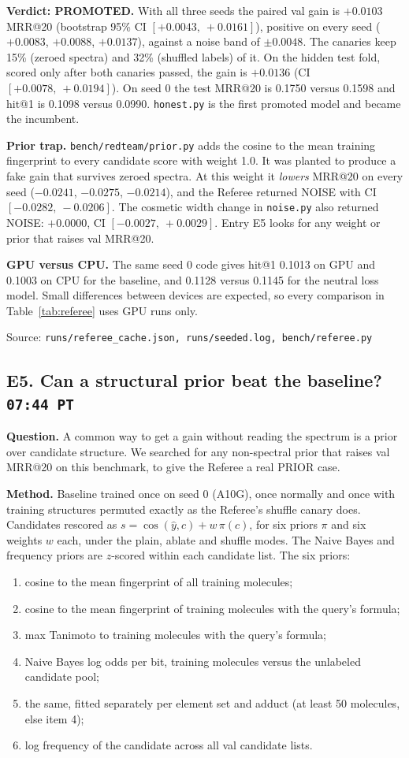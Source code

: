 \documentclass[11pt]{article}
\newcommand{\entry}[2]{\subsection*{#1\hfill{\normalfont\small\texttt{#2}}}}
\newcommand{\src}[1]{{\small\color{black!60}Source: \texttt{#1}}}
\begin{document}
\textbf{Verdict: PROMOTED.} With all three seeds the paired val gain is $+0.0103$ MRR@20 (bootstrap 95\% CI
$[+0.0043,\ +0.0161]$), positive on every seed ($+0.0083$, $+0.0088$, $+0.0137$), against a noise band of
$\pm 0.0048$. The canaries keep 15\% (zeroed spectra) and 32\% (shuffled labels) of it. On the hidden test fold,
scored only after both canaries passed, the gain is $+0.0136$ (CI $[+0.0078,\ +0.0194]$). On seed 0 the test MRR@20 is 0.1750 versus
0.1598 and hit@1 is 0.1098 versus 0.0990. \texttt{honest.py} is the first promoted model and became the incumbent.

\textbf{Prior trap.} \texttt{bench/redteam/prior.py} adds the cosine to the mean training fingerprint to every
candidate score with weight 1.0. It was planted to produce a fake gain that survives zeroed spectra. At this weight it
\emph{lowers} MRR@20 on every seed ($-0.0241$, $-0.0275$, $-0.0214$), and the Referee returned NOISE with CI
$[-0.0282,\ -0.0206]$. The cosmetic width change in \texttt{noise.py} also returned NOISE: $+0.0000$, CI
$[-0.0027,\ +0.0029]$.
Entry E5 looks for any weight or prior that raises val MRR@20.

\textbf{GPU versus CPU.} The same seed 0 code gives hit@1 0.1013 on GPU and 0.1003 on CPU for the baseline, and 0.1128
versus 0.1145 for the neutral loss model. Small differences between devices are
expected, so every comparison in Table~\ref{tab:referee} uses GPU runs only.

\src{runs/referee\_cache.json, runs/seeded.log, bench/referee.py}

\entry{E5. Can a structural prior beat the baseline?}{07:44 PT}

\textbf{Question.} A common way to get a gain without reading the spectrum is a prior over candidate structure.
We searched for any non-spectral prior that raises val MRR@20 on this benchmark, to give the Referee a real PRIOR case.

\textbf{Method.} Baseline trained once on seed 0 (A10G), once normally and once with training structures permuted
exactly as the Referee's shuffle canary does. Candidates rescored as
$s = \cos(\hat{y}, c) + w\,\pi(c)$, for six priors $\pi$ and six weights $w$ each, under the plain, ablate and shuffle
modes. The Naive Bayes and frequency priors are $z$-scored within each candidate list. The six priors:
\begin{enumerate}
  \item cosine to the mean fingerprint of all training molecules;
  \item cosine to the mean fingerprint of training molecules with the query's formula;
  \item max Tanimoto to training molecules with the query's formula;
  \item Naive Bayes log odds per bit, training molecules versus the unlabeled candidate pool;
  \item the same, fitted separately per element set and adduct (at least 50 molecules, else item 4);
  \item log frequency of the candidate across all val candidate lists.
\end{enumerate}
\end{document}
